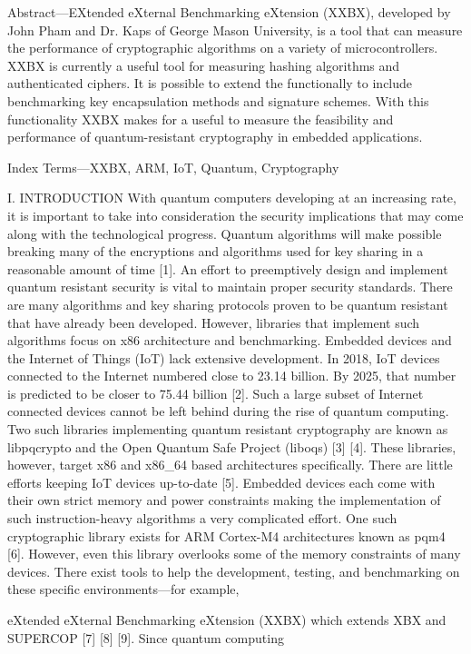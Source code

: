 Abstract—EXtended eXternal Benchmarking eXtension (XXBX), developed by John Pham and Dr. Kaps of George Mason University, is a tool that can measure the performance of cryptographic algorithms on a variety of microcontrollers. XXBX is currently a useful tool for measuring hashing algorithms and authenticated ciphers. It is possible to extend the functionally to include benchmarking key encapsulation methods and signature schemes. With this functionality XXBX makes for a useful to measure the feasibility and performance of quantum-resistant cryptography in embedded applications.

Index Terms—XXBX, ARM, IoT, Quantum, Cryptography

I. INTRODUCTION
With quantum computers developing at an increasing rate, it is important to take into consideration the security implications that may come along with the technological progress. Quantum algorithms will make possible breaking many of the encryptions and algorithms used for key sharing in a reasonable amount of time [1]. An effort to preemptively design and implement quantum resistant security is vital to maintain proper security standards.
	There are many algorithms and key sharing protocols proven to be quantum resistant that have already been developed. However, libraries that implement such algorithms focus on x86 architecture and benchmarking. Embedded devices and the Internet of Things (IoT) lack extensive development. In 2018, IoT devices connected to the Internet numbered close to 23.14 billion. By 2025, that number is predicted to be closer to 75.44 billion [2]. Such a large subset of Internet connected devices cannot be left behind during the rise of quantum computing.
	Two such libraries implementing quantum resistant cryptography are known as libpqcrypto and the Open Quantum Safe Project (liboqs) [3] [4]. These libraries, however, target x86 and x86_64 based architectures specifically. There are little efforts keeping IoT devices up-to-date [5].
	Embedded devices each come with their own strict memory and power constraints making the implementation of such instruction-heavy algorithms a very complicated effort. One such cryptographic library exists for ARM Cortex-M4 architectures known as pqm4 [6]. However, even this library overlooks some of the memory constraints of many devices. There exist tools to help the development, testing, and benchmarking on these specific environments—for example,

eXtended eXternal Benchmarking eXtension (XXBX) which extends XBX and SUPERCOP [7] [8] [9]. Since quantum computing

